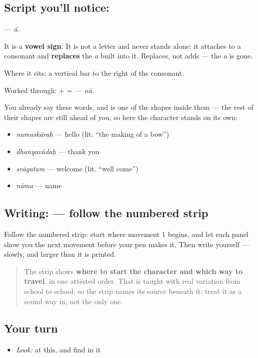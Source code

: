 \subsection*{Script you'll notice: }
\textbf{} — \emph{ā}.

It is a \textbf{vowel sign}. It is not a letter and never stands alone: it attaches to a consonant and \textbf{replaces} the \emph{a} built into it. Replaces, not adds — the \emph{a} is gone.

Where it sits: a vertical bar to the right of the consonant.

Worked through: \textbf{} + \textbf{} = \textbf{} — \emph{nā}.

You already say these words, and  is one of the shapes inside them — the rest of their shapes are still ahead of you, so here the character stands on its own:

\begin{itemize}
\raggedright
  \item \emph{namaskāraḥ} — hello (lit. \textquotedblleft{}the making of a bow\textquotedblright{})
  \item \emph{dhanyavādaḥ} — thank you
  \item \emph{svāgatam} — welcome (lit. \textquotedblleft{}well come\textquotedblright{})
  \item \emph{nāma} — name
\end{itemize}

\subsection*{Writing:  — follow the numbered strip}

Follow the numbered strip: start where movement 1 begins, and let each panel show you the next movement before your pen makes it. Then write  yourself — slowly, and larger than it is printed.

\begin{quote}
The strip shows \textbf{where to start the character and which way to travel}, in one attested order. That is taught with real variation from school to school, so the strip names its source beneath it: treat it as a sound way in, not the only one.
\end{quote}

\subsection*{Your turn}
\begin{itemize}
\raggedright
  \item \emph{Look:} at this, and find  in it
\end{itemize}

